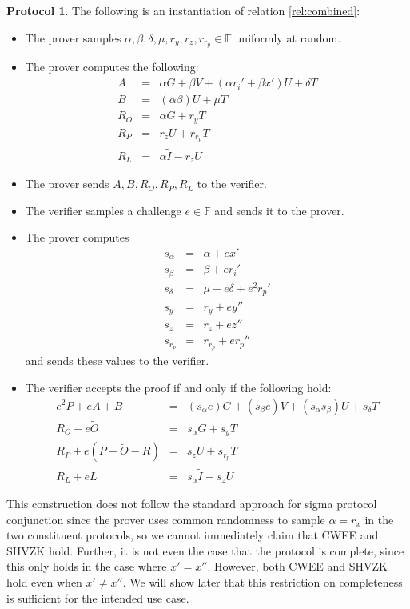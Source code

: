 \documentclass{article}
\theoremstyle{definition}
\newtheorem{protocol}{Protocol}
\newcommand{\FF}{\mathbb{F}}
\newcommand{\wt}[1]{\widetilde{#1}}
\begin{document}
\begin{protocol}
	The following is an instantiation of relation \ref{rel:combined}:
	\begin{itemize}
		\item The prover samples $\alpha, \beta, \delta, \mu, r_y, r_z, r_{r_p} \in \FF$ uniformly at random.
		\item The prover computes the following:
		\begin{eqnarray*}
			A &=& \alpha G + \beta V + (\alpha r_i' + \beta x') U + \delta T \\
			B &=& (\alpha \beta) U + \mu T \\	
			R_O &=& \alpha G + r_y T \\
			R_P &=& r_z U + r_{r_p} T \\
			R_L &=& \alpha \wt{I} - r_z U
		\end{eqnarray*}
		\item The prover sends $A, B, R_O, R_P, R_L$ to the verifier.
		\item The verifier samples a challenge $e \in \FF$ and sends it to the prover.
		\item The prover computes
		\begin{eqnarray*}
			s_\alpha &=& \alpha + e x' \\
			s_\beta &=& \beta + e r_i' \\
			s_\delta &=& \mu + e \delta + e^2 r_p' \\
			s_y &=& r_y + e y'' \\
			s_z &=& r_z + e z'' \\
			s_{r_p} &=& r_{r_p} + e r_p''
		\end{eqnarray*}
		and sends these values to the verifier.
		\item The verifier accepts the proof if and only if the following hold:
		\begin{eqnarray*}
			e^2 P + e A + B &=& (s_\alpha e) G + (s_\beta e) V + (s_\alpha s_\beta) U + s_\delta T \\
			R_O + e \wt{O} &=& s_\alpha G + s_y T \\
			R_P + e (P - \wt{O} - R) &=& s_z U + s_{r_p} T \\
			R_L + e L &=& s_\alpha \wt{I} - s_z U
		\end{eqnarray*}
	\end{itemize}
\end{protocol}

This construction does not follow the standard approach for sigma protocol conjunction since the prover uses common randomness to sample $\alpha = r_x$ in the two constituent protocols, so we cannot immediately claim that CWEE and SHVZK hold.
Further, it is not even the case that the protocol is complete, since this only holds in the case where $x' = x''$.
However, both CWEE and SHVZK hold even when $x' \neq x''$.
We will show later that this restriction on completeness is sufficient for the intended use case.
\end{document}

